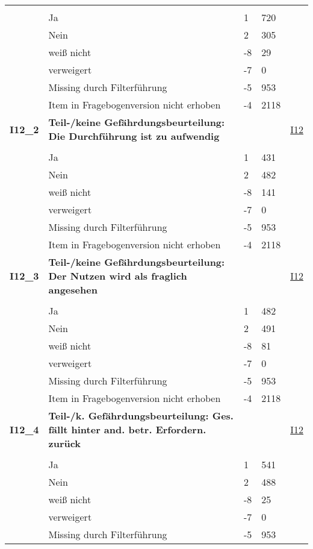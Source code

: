 \begin{longtable}{| L{2.5cm} | L{8.25cm}| C{1.5cm} | R{1.25cm} | C{2.25cm} |  }
   &  &  &  &  \\ 
   & Ja & 1 & 720 &  \\ 
   & Nein & 2 & 305 &  \\ 
   & weiß nicht & -8 & 29 &  \\ 
   & verweigert & -7 & 0 &  \\ 
   & Missing durch Filterführung & -5 & 953 &  \\ 
   & Item in Fragebogenversion nicht erhoben & -4 & 2118 &  \\ 
   \midrule
\textbf{I12\_2}\label{var:suf:I12:2} & \textbf{Teil-/keine Gefährdungsbeurteilung: Die Durchführung ist zu aufwendig} &  &  & \hyperref[I12]{I12} \\ 
   &  &  &  &  \\ 
   & Ja & 1 & 431 &  \\ 
   & Nein & 2 & 482 &  \\ 
   & weiß nicht & -8 & 141 &  \\ 
   & verweigert & -7 & 0 &  \\ 
   & Missing durch Filterführung & -5 & 953 &  \\ 
   & Item in Fragebogenversion nicht erhoben & -4 & 2118 &  \\ 
   \midrule
\textbf{I12\_3}\label{var:suf:I12:3} & \textbf{Teil-/keine Gefährdungsbeurteilung: Der Nutzen wird als fraglich angesehen} &  &  & \hyperref[I12]{I12} \\ 
   &  &  &  &  \\ 
   & Ja & 1 & 482 &  \\ 
   & Nein & 2 & 491 &  \\ 
   & weiß nicht & -8 & 81 &  \\ 
   & verweigert & -7 & 0 &  \\ 
   & Missing durch Filterführung & -5 & 953 &  \\ 
   & Item in Fragebogenversion nicht erhoben & -4 & 2118 &  \\ 
   \midrule
\textbf{I12\_4}\label{var:suf:I12:4} & \textbf{Teil-/k. Gefährdungsbeurteilung: Ges. fällt hinter and. betr. Erfordern. zurück} &  &  & \hyperref[I12]{I12} \\ 
   &  &  &  &  \\ 
   & Ja & 1 & 541 &  \\ 
   & Nein & 2 & 488 &  \\ 
   & weiß nicht & -8 & 25 &  \\ 
   & verweigert & -7 & 0 &  \\ 
   & Missing durch Filterführung & -5 & 953 &  \\ 

\end{longtable}
